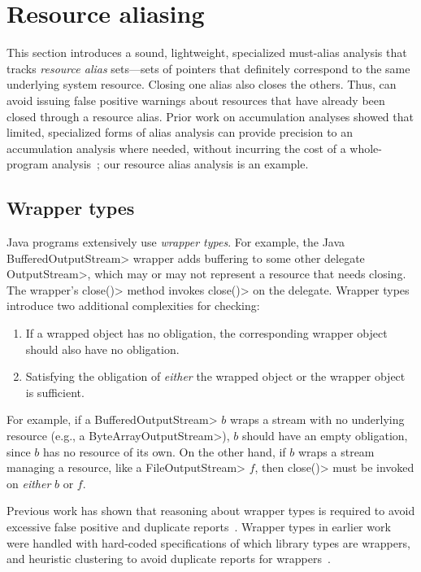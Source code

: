 \section{Resource aliasing}
\label{sec:must-call-choice}

This section introduces a sound, lightweight, specialized must-alias analysis
that tracks \emph{resource alias} sets---sets of pointers that
definitely correspond to the same underlying system resource.  Closing
one alias also closes the others.  Thus,
\Tool can avoid issuing false positive warnings about resources
that have already been closed through a resource alias.  Prior
work on accumulation analyses showed that limited, specialized forms
of alias analysis can provide precision to an accumulation analysis
where needed, without incurring the cost of a whole-program
analysis~\cite{KelloggRSSE2020}; our resource alias analysis is an
example.

\subsection{Wrapper types}

Java programs extensively use \emph{wrapper types}.  For example, the Java
\<BufferedOutputStream> wrapper adds buffering to some other delegate \<OutputStream>, which
may or may not represent a resource that needs closing.  The wrapper's 
\<close()> method invokes \<close()> on the delegate.
Wrapper types
introduce two additional complexities for \MustCall checking:
\begin{enumerate}
  \item If a wrapped object has no \MustCall obligation, the corresponding
  wrapper object should also have no obligation.
  \item Satisfying the obligation of \emph{either} the wrapped object or the
  wrapper object is sufficient.
\end{enumerate}
For example, if a \<BufferedOutputStream> $b$ wraps a stream with no underlying
resource (e.g., a \<ByteArrayOutputStream>), $b$ should have an empty
\MustCall obligation, since $b$ has no resource of its own.  On the other
hand, if $b$ wraps a stream managing a resource, like a \<FileOutputStream> $f$,
then \<close()> must be invoked on \emph{either} $b$ or $f$.

Previous work has shown that reasoning about wrapper types is
required to avoid excessive false positive and duplicate
reports~\cite{TorlakC10,ecj-resource-leak}.  Wrapper types in earlier
work were handled with hard-coded specifications of which library
types are wrappers, and heuristic clustering to avoid duplicate reports for
wrappers~\cite{TorlakC10}.


